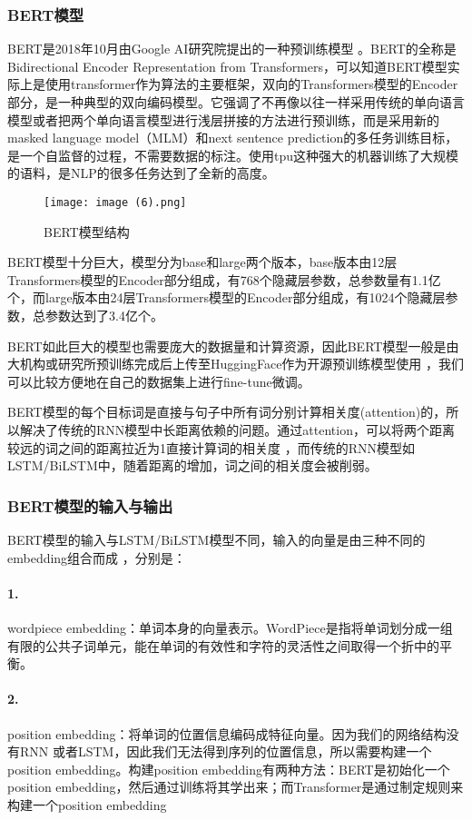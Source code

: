 \documentclass{article}
\begin{document}
\subsubsection{BERT模型}
BERT是2018年10月由Google AI研究院提出的一种预训练模型\cite{devlin2018bert} 。BERT的全称是Bidirectional Encoder Representation from Transformers，可以知道BERT模型实际上是使用transformer作为算法的主要框架，双向的Transformers模型的Encoder部分，是一种典型的双向编码模型。它强调了不再像以往一样采用传统的单向语言模型或者把两个单向语言模型进行浅层拼接的方法进行预训练，而是采用新的masked language model（MLM）和next sentence prediction的多任务训练目标，是一个自监督的过程，不需要数据的标注。使用tpu这种强大的机器训练了大规模的语料，是NLP的很多任务达到了全新的高度。

\begin{figure}[H]
	\centering
    \texttt{[image: image (6).png]}
    \caption{BERT模型结构}
    \label{fig:BERT}
\end{figure}

BERT模型十分巨大，模型分为base和large两个版本，base版本由12层Transformers模型的Encoder部分组成，有768个隐藏层参数，总参数量有1.1亿个，而large版本由24层Transformers模型的Encoder部分组成，有1024个隐藏层参数，总参数达到了3.4亿个。

BERT如此巨大的模型也需要庞大的数据量和计算资源，因此BERT模型一般是由大机构或研究所预训练完成后上传至HuggingFace作为开源预训练模型使用\cite{wolf2019huggingface} ，我们可以比较方便地在自己的数据集上进行fine-tune微调。

BERT模型的每个目标词是直接与句子中所有词分别计算相关度(attention)的，所以解决了传统的RNN模型中长距离依赖的问题。通过attention，可以将两个距离较远的词之间的距离拉近为1直接计算词的相关度\cite{clark2019does} ，而传统的RNN模型如LSTM/BiLSTM中，随着距离的增加，词之间的相关度会被削弱。
\subsubsection{BERT模型的输入与输出}
BERT模型的输入与LSTM/BiLSTM模型不同，输入的向量是由三种不同的embedding组合而成\cite{devlin2018bert} ，分别是：
\paragraph{1.}  wordpiece embedding：单词本身的向量表示。WordPiece是指将单词划分成一组有限的公共子词单元，能在单词的有效性和字符的灵活性之间取得一个折中的平衡。
\paragraph{2.} position embedding：将单词的位置信息编码成特征向量。因为我们的网络结构没有RNN 或者LSTM，因此我们无法得到序列的位置信息，所以需要构建一个position embedding。构建position embedding有两种方法：BERT是初始化一个position embedding，然后通过训练将其学出来；而Transformer是通过制定规则来构建一个position embedding
\end{document}
